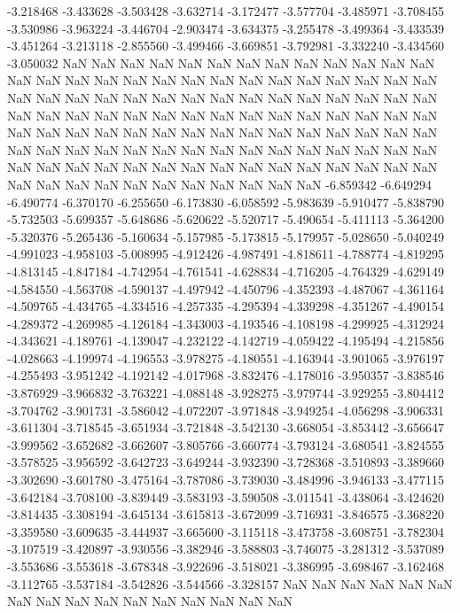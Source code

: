 -3.218468
-3.433628
-3.503428
-3.632714
-3.172477
-3.577704
-3.485971
-3.708455
-3.530986
-3.963224
-3.446704
-2.903474
-3.634375
-3.255478
-3.499364
-3.433539
-3.451264
-3.213118
-2.855560
-3.499466
-3.669851
-3.792981
-3.332240
-3.434560
-3.050032
NaN
NaN
NaN
NaN
NaN
NaN
NaN
NaN
NaN
NaN
NaN
NaN
NaN
NaN
NaN
NaN
NaN
NaN
NaN
NaN
NaN
NaN
NaN
NaN
NaN
NaN
NaN
NaN
NaN
NaN
NaN
NaN
NaN
NaN
NaN
NaN
NaN
NaN
NaN
NaN
NaN
NaN
NaN
NaN
NaN
NaN
NaN
NaN
NaN
NaN
NaN
NaN
NaN
NaN
NaN
NaN
NaN
NaN
NaN
NaN
NaN
NaN
NaN
NaN
NaN
NaN
NaN
NaN
NaN
NaN
NaN
NaN
NaN
NaN
NaN
NaN
NaN
NaN
NaN
NaN
NaN
NaN
NaN
NaN
NaN
NaN
NaN
NaN
NaN
NaN
NaN
NaN
NaN
NaN
NaN
NaN
NaN
NaN
NaN
NaN
NaN
NaN
NaN
NaN
NaN
NaN
NaN
NaN
NaN
NaN
NaN
NaN
NaN
NaN
-6.859342
-6.649294
-6.490774
-6.370170
-6.255650
-6.173830
-6.058592
-5.983639
-5.910477
-5.838790
-5.732503
-5.699357
-5.648686
-5.620622
-5.520717
-5.490654
-5.411113
-5.364200
-5.320376
-5.265436
-5.160634
-5.157985
-5.173815
-5.179957
-5.028650
-5.040249
-4.991023
-4.958103
-5.008995
-4.912426
-4.987491
-4.818611
-4.788774
-4.819295
-4.813145
-4.847184
-4.742954
-4.761541
-4.628834
-4.716205
-4.764329
-4.629149
-4.584550
-4.563708
-4.590137
-4.497942
-4.450796
-4.352393
-4.487067
-4.361164
-4.509765
-4.434765
-4.334516
-4.257335
-4.295394
-4.339298
-4.351267
-4.490154
-4.289372
-4.269985
-4.126184
-4.343003
-4.193546
-4.108198
-4.299925
-4.312924
-4.343621
-4.189761
-4.139047
-4.232122
-4.142719
-4.059422
-4.195494
-4.215856
-4.028663
-4.199974
-4.196553
-3.978275
-4.180551
-4.163944
-3.901065
-3.976197
-4.255493
-3.951242
-4.192142
-4.017968
-3.832476
-4.178016
-3.950357
-3.838546
-3.876929
-3.966832
-3.763221
-4.088148
-3.928275
-3.979744
-3.929255
-3.804412
-3.704762
-3.901731
-3.586042
-4.072207
-3.971848
-3.949254
-4.056298
-3.906331
-3.611304
-3.718545
-3.651934
-3.721848
-3.542130
-3.668054
-3.853442
-3.656647
-3.999562
-3.652682
-3.662607
-3.805766
-3.660774
-3.793124
-3.680541
-3.824555
-3.578525
-3.956592
-3.642723
-3.649244
-3.932390
-3.728368
-3.510893
-3.389660
-3.302690
-3.601780
-3.475164
-3.787086
-3.739030
-3.484996
-3.946133
-3.477115
-3.642184
-3.708100
-3.839449
-3.583193
-3.590508
-3.011541
-3.438064
-3.424620
-3.814435
-3.308194
-3.645134
-3.615813
-3.672099
-3.716931
-3.846575
-3.368220
-3.359580
-3.609635
-3.444937
-3.665600
-3.115118
-3.473758
-3.608751
-3.782304
-3.107519
-3.420897
-3.930556
-3.382946
-3.588803
-3.746075
-3.281312
-3.537089
-3.553686
-3.553618
-3.678348
-3.922696
-3.518021
-3.386995
-3.698467
-3.162468
-3.112765
-3.537184
-3.542826
-3.544566
-3.328157
NaN
NaN
NaN
NaN
NaN
NaN
NaN
NaN
NaN
NaN
NaN
NaN
NaN
NaN
NaN
NaN
